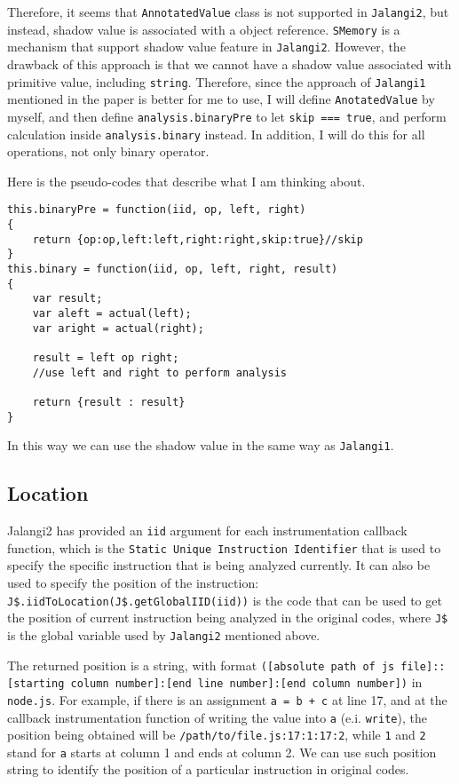 Therefore, it seems that \texttt{AnnotatedValue} class is not supported in \texttt{Jalangi2}, but instead, shadow value is associated with a object reference. \texttt{SMemory} is a mechanism that support shadow value feature in \texttt{Jalangi2}. However, the drawback of this approach is that we cannot have a shadow value associated with primitive value, including \texttt{string}. Therefore, since the approach of \texttt{Jalangi1} mentioned in the paper is better for me to use, I will define \texttt{AnotatedValue} by myself, and then define \texttt{analysis.binaryPre} to let \texttt{skip === true}, and perform calculation inside \texttt{analysis.binary} instead. In addition, I will do this for all operations, not only binary operator.

Here is the pseudo-codes that describe what I am thinking about.

\begin{verbatim}
this.binaryPre = function(iid, op, left, right)
{
    return {op:op,left:left,right:right,skip:true}//skip
}
this.binary = function(iid, op, left, right, result)
{
    var result;
    var aleft = actual(left);
    var aright = actual(right);

    result = left op right;
    //use left and right to perform analysis

    return {result : result} 
}
\end{verbatim}


In this way we can use the shadow value in the same way as \texttt{Jalangi1}. 

\subsection{Location}

Jalangi2 has provided an \texttt{iid} argument for each instrumentation callback function, which is the \texttt{Static Unique Instruction Identifier} that is used to specify the specific instruction that is being analyzed currently. It can also be used to specify the position of the instruction: \texttt{J\$.iidToLocation(J\$.getGlobalIID(iid))} is the code that can be used to get the position of current instruction being analyzed in the original codes, where \texttt{J\$} is the global variable used by \texttt{Jalangi2} mentioned above.

The returned position is a string, with format \texttt{([absolute path of js file]::[starting column number]:[end line number]:[end \newline column number])} in \texttt{node.js}. For example, if there is an assignment \texttt{a = b + c} at line 17, and at the callback instrumentation function of writing the value into \texttt{a} (e.i. \texttt{write}), the position being obtained will be \texttt{/path/to/file.js:17:1:17:2}, while \texttt{1} and \texttt{2} stand for \texttt{a} starts at column 1 and ends at column 2. We can use such position string to identify the position of a particular instruction in original codes.

